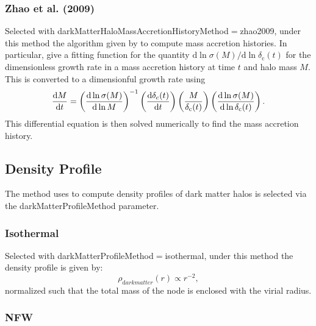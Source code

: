 \subsubsection{Zhao et al. (2009)}

Selected with {\normalfont \ttfamily darkMatterHaloMassAccretionHistoryMethod}$=${\normalfont \ttfamily zhao2009}, under this method the algorithm given by \cite{zhao_accurate_2009} to compute mass accretion histories. In particular, \cite{zhao_accurate_2009} give a fitting function for the quantity ${\mathrm d} \ln \sigma(M)/{\mathrm d} \ln  \delta_{\mathrm c}(t)$ for the dimensionless growth rate in a mass accretion history at time $t$ and halo mass $M$. This is converted to a dimensionful growth rate using
\begin{equation}
 {{\mathrm d} M \over {\mathrm d} t} = \left({{\mathrm d} \ln \sigma(M) \over {\mathrm d} \ln M}\right)^{-1} \left({{\mathrm d} \delta_c(t) \over {\mathrm d} t}\right) \left( {M \over \delta_{\mathrm c}(t)} \right) \left({{\mathrm d} \ln \sigma(M) \over {\mathrm d} \ln \delta_{\mathrm c}(t)}\right).
\end{equation}
This differential equation is then solved numerically to find the mass accretion history.

\subsection{Density Profile}\label{phys:darkMatterProfile}

The method uses to compute density profiles of dark matter halos is selected via the {\normalfont \ttfamily darkMatterProfileMethod} parameter.

\subsubsection{Isothermal}\label{phys:darkMatterProfile:darkMatterProfileIsothermal}

Selected with {\normalfont \ttfamily darkMatterProfileMethod}$=${\normalfont \ttfamily isothermal}, under this method the density profile is given by:
\begin{equation}
 \rho_{\mathrm dark matter}(r) \propto r^{-2},
\end{equation}
normalized such that the total mass of the \gls{node} is enclosed with the virial radius.

\subsubsection{NFW}\label{phys:darkMatterProfile:darkMatterProfileNFW}

